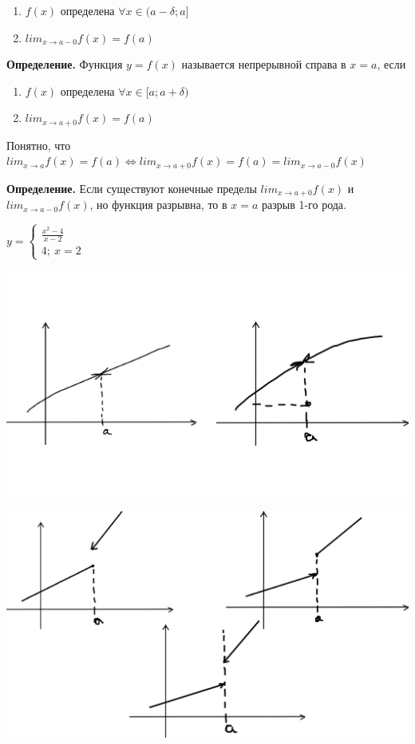 \documentclass{article}
\begin{document}
    \begin{enumerate}
        \item \(f(x)\) определена \( \forall x \in (a - \delta; a] \)
        \item \(lim_{x\rightarrow a-0} f(x)=f(a)\)
    \end{enumerate}

    \textbf{Определение.} Функция \(y = f(x)\) называется непрерывной справа в \(x = a\), если
    
    \begin{enumerate}
        \item \(f(x)\) определена \( \forall x \in [a; a + \delta) \)
        \item \(lim_{x\rightarrow a+0} f(x)=f(a)\)
    \end{enumerate}

    Понятно, что \( lim_{x \rightarrow a} f(x) = f(a) \Leftrightarrow lim_{x \rightarrow a + 0} f(x) = f(a) = lim_{x \rightarrow a - 0} f(x) \)

    \textbf{Определение.} Если существуют конечные пределы \(lim_{x \rightarrow a+0} f(x)\) и \(lim_{x \rightarrow a-0} f(x)\), но функция разрывна, то в \(x=a\) разрыв 1-го рода.

    \(y=\begin{cases}\frac{x^2-4}{x-2}\\ 4;\ x=2\end{cases}\)

    \begin{minipage}{0.49\linewidth}
        \includegraphics[trim={0 9cm 0 9cm},clip, width=\linewidth]{11_1_3_2.png}

        \includegraphics[width=\linewidth]{11_1_3_3.png}
    \end{minipage}
\end{document}
